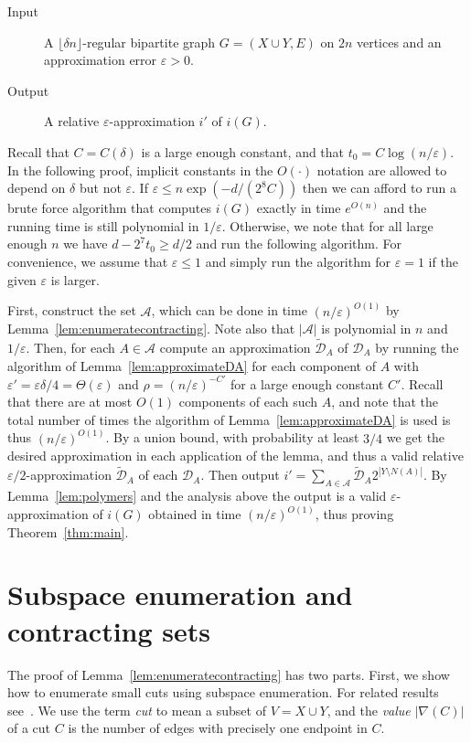 \documentclass[11pt,letterpaper]{amsart}
\theoremstyle{definition}
\newcommand{\eps}{\varepsilon}
\begin{document}
\begin{description}
\item[Input] A $\lfloor\delta n\rfloor$-regular bipartite graph $G=(X\cup Y, E)$ on $2n$ vertices and an approximation error $\eps>0$.
\item[Output] A relative $\eps$-approximation $i'$ of $i(G)$.
\end{description}

Recall that $C=C(\delta)$ is a large enough constant, and that $t_0=C\log(n/\eps)$. In the following proof, implicit constants in the $O(\cdot)$ notation are allowed to depend on $\delta$ but not $\eps$.
If $\eps \le n\exp(-d /(2^8C))$ then we can afford to run a brute force algorithm that computes $i(G)$ exactly in time $e^{O(n)}$ and the running time is still polynomial in $1/\eps$. 
Otherwise, we note that for all large enough $n$ we have $d-2^7 t_0\ge d/2$ and run the following algorithm.
For convenience, we assume that $\eps\le 1$ and simply run the algorithm for $\eps=1$ if the given $\eps$ is larger.

First, construct the set $\mathcal A$, which can be done in time $(n/\eps)^{O(1)}$ by Lemma~\ref{lem:enumeratecontracting}. 
Note also that $|\mathcal{A}|$ is polynomial in $n$ and $1/\eps$.
Then, for each $A\in\mathcal A$ compute an approximation $\tilde{\mathcal D}_A$ of $\mathcal D_A$ by running the algorithm of Lemma~\ref{lem:approximateDA} for each component of $A$ with $\eps'=\eps\delta/4=\Theta(\eps)$ and $\rho=(n/\eps)^{-C'}$ for a large enough constant $C'$.
Recall that there are at most $O(1)$ components of each such $A$, and note that the total number of times the algorithm of Lemma~\ref{lem:approximateDA} is used is thus $(n/\eps)^{O(1)}$. 
By a union bound, with probability at least $3/4$ we get the desired approximation in each application of the lemma, and thus a valid relative $\eps/2$-approximation $\tilde{\mathcal D}_A$ of each $\mathcal D_A$.
Then output $i'=\sum_{A\in\mathcal{A}}\tilde{\mathcal D}_A 2^{|Y\setminus N(A)|}$.
By Lemma~\ref{lem:polymers} and the analysis above the output is a valid $\eps$-approximation of $i(G)$ obtained in time $(n/\eps)^{O(1)}$, thus proving Theorem~\ref{thm:main}.

\section{Subspace enumeration and contracting sets}\label{sec:cuts}

The proof of Lemma~\ref{lem:enumeratecontracting} has two parts. First, we show how to enumerate small cuts using subspace enumeration. For related results see~\cite{ABS10,Kol10,KT07}. 
We use the term \emph{cut} to mean a subset of $V=X\cup Y$, and the \emph{value} $|\nabla(C)|$ of a cut $C$ is the number of edges with precisely one endpoint in $C$.
\end{document}
